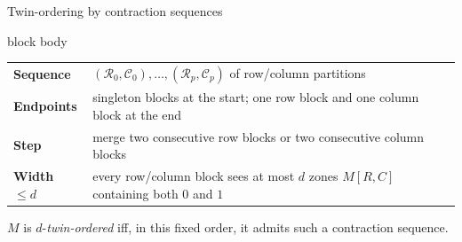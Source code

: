 \documentclass[aspectratio=169,11pt]{beamer}
\renewcommand{\leq}{\leqslant}
\begin{document}
\begin{frame}{Twin-ordering by contraction sequences}
\begin{beamercolorbox}[wd=\textwidth,sep=0.65ex,rounded=true]{block body}
{\footnotesize
\renewcommand{\arraystretch}{1.18}
\begin{tabular}{@{}p{}p{}@{}}
\textbf{Sequence} & $(\mathcal{R}_0,\mathcal{C}_0),\ldots,(\mathcal{R}_p,\mathcal{C}_p)$ of row/column partitions\\
\textbf{Endpoints} & singleton blocks at the start; one row block and one column block at the end\\
\textbf{Step} & merge two consecutive row blocks or two consecutive column blocks\\
\textbf{Width $\leq d$} & every row/column block sees at most $d$ zones $M[R,C]$ containing both $0$ and $1$
\end{tabular}
}
\end{beamercolorbox}

\smallskip
\begin{alertblock}{}
\small $M$ is $d$-\emph{twin-ordered} iff, in this fixed order, it admits such a contraction sequence.
\end{alertblock}


\end{frame}
\end{document}
